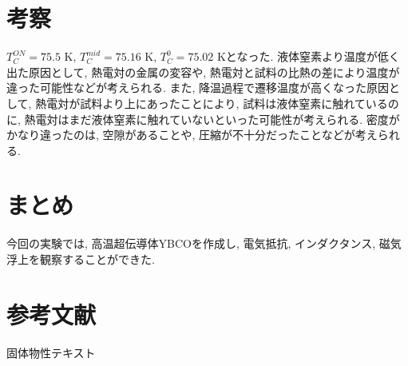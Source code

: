 \documentclass[11pt]{ltjsarticle}
\begin{document}
  \section*{考察}
  $T_C^{ON}=75.5$ K, $T_C^{mid}=75.16$ K, $T_C^{0}=75.02$ Kとなった. 液体窒素より温度が低く出た原因として, 熱電対の金属の変容や, 熱電対と試料の比熱の差により温度が違った可能性などが考えられる. また, 降温過程で遷移温度が高くなった原因として, 熱電対が試料より上にあったことにより, 試料は液体窒素に触れているのに, 熱電対はまだ液体窒素に触れていないといった可能性が考えられる.
  密度がかなり違ったのは, 空隙があることや, 圧縮が不十分だったことなどが考えられる.
  \section*{まとめ}
  今回の実験では, 高温超伝導体YBCOを作成し, 電気抵抗, インダクタンス, 磁気浮上を観察することができた.
  \section*{参考文献}
  固体物性テキスト
\end{document}
